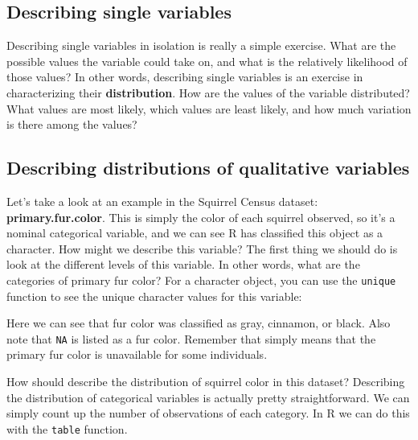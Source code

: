 \documentclass[
]{book}
\newenvironment{Shaded}{\begin{snugshade}}{\end{snugshade}}
\newcommand{\ConstantTok}[1]{\textcolor[rgb]{0.56,0.35,0.01}{#1}}
\newcommand{\DecValTok}[1]{\textcolor[rgb]{0.00,0.00,0.81}{#1}}
\newcommand{\ErrorTok}[1]{\textcolor[rgb]{0.64,0.00,0.00}{\textbf{#1}}}
\newcommand{\FunctionTok}[1]{\textcolor[rgb]{0.13,0.29,0.53}{\textbf{#1}}}
\newcommand{\NormalTok}[1]{#1}
\newcommand{\SpecialCharTok}[1]{\textcolor[rgb]{0.81,0.36,0.00}{\textbf{#1}}}
\newcommand{\StringTok}[1]{\textcolor[rgb]{0.31,0.60,0.02}{#1}}
\begin{document}
\subsection{Describing single variables}\label{describing-single-variables}

Describing single variables in isolation is really a simple exercise. What are the possible values the variable could take on, and what is the relatively likelihood of those values? In other words, describing single variables is an exercise in characterizing their \textbf{distribution}. How are the values of the variable distributed? What values are most likely, which values are least likely, and how much variation is there among the values?

\subsection{Describing distributions of qualitative variables}\label{describing-distributions-of-qualitative-variables}

Let's take a look at an example in the Squirrel Census dataset: \textbf{primary.fur.color}. This is simply the color of each squirrel observed, so it's a nominal categorical variable, and we can see R has classified this object as a character. How might we describe this variable? The first thing we should do is look at the different levels of this variable. In other words, what are the categories of primary fur color? For a character object, you can use the \texttt{unique} function to see the unique character values for this variable:

\begin{Shaded}
\end{Shaded}

Here we can see that fur color was classified as gray, cinnamon, or black. Also note that \texttt{NA} is listed as a fur color. Remember that simply means that the primary fur color is unavailable for some individuals.

How should describe the distribution of squirrel color in this dataset? Describing the distribution of categorical variables is actually pretty straightforward. We can simply count up the number of observations of each category. In R we can do this with the \texttt{table} function.
\end{document}
